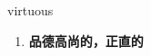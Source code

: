 
\begin{frame}
{\huge virtuous}
\begin{center}
\begin{enumerate}\Large
  \item \textbf{品德高尚的，正直的}
\end{enumerate}
\end{center}
\end{frame}

